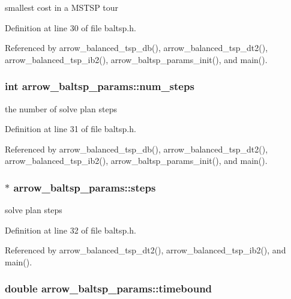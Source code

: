 smallest cost in a MSTSP tour 

Definition at line 30 of file baltsp.h.

Referenced by arrow\_\-balanced\_\-tsp\_\-db(), arrow\_\-balanced\_\-tsp\_\-dt2(), arrow\_\-balanced\_\-tsp\_\-ib2(), arrow\_\-baltsp\_\-params\_\-init(), and main().\hypertarget{structarrow__baltsp__params_9be4abd8a4912b119b55e35f9b8cfe13}{
\subsubsection[{num\_\-steps}]{\setlength{\rightskip}{0pt plus 5cm}int {\bf arrow\_\-baltsp\_\-params::num\_\-steps}}}
\label{structarrow__baltsp__params_9be4abd8a4912b119b55e35f9b8cfe13}


the number of solve plan steps 

Definition at line 31 of file baltsp.h.

Referenced by arrow\_\-balanced\_\-tsp\_\-db(), arrow\_\-balanced\_\-tsp\_\-dt2(), arrow\_\-balanced\_\-tsp\_\-ib2(), arrow\_\-baltsp\_\-params\_\-init(), and main().\hypertarget{structarrow__baltsp__params_3b293a7e80cd4bec67ede60bab8007b1}{
\subsubsection[{steps}]{$\ast$ {\bf arrow\_\-baltsp\_\-params::steps}}}
\label{structarrow__baltsp__params_3b293a7e80cd4bec67ede60bab8007b1}


solve plan steps 

Definition at line 32 of file baltsp.h.

Referenced by arrow\_\-balanced\_\-tsp\_\-dt2(), arrow\_\-balanced\_\-tsp\_\-ib2(), and main().\hypertarget{structarrow__baltsp__params_0ff80620b5045d4769810df2b4de7063}{
\subsubsection[{timebound}]{\setlength{\rightskip}{0pt plus 5cm}double {\bf arrow\_\-baltsp\_\-params::timebound}}}
\label{structarrow__baltsp__params_0ff80620b5045d4769810df2b4de7063}


